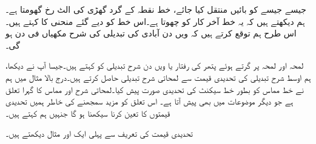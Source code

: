 جیسے جیسے  کو بائیں منتقل کیا جائے، خط  نقطہ  کے گرد گھڑی کی الٹ رخ گھومتا ہے۔ہم دیکھتے ہیں کہ یہ خط آخر کار  کو چھوتا ہے۔اس خط کو دیے گئے منحنی کا  کہتے ہیں۔اس طرح ہم توقع کرتے ہیں کہ  ویں دن آبادی کی تبدیلی کی شرح  مکھیاں فی دن ہو گی۔

لمحہ  اور لمحہ  پر گرتے ہوئے پتھر کی رفتار یا  ویں دن شرح تبدیلی کو  کہتے ہیں۔جیسا آپ نے دیکھا، ہم اوسط شرح تبدیلی کی تحدیدی قیمت سے لمحاتی شرح تبدیلی حاصل کرتے ہیں۔درج بالا مثال میں ہم نے خط مماس کو بطور خط سیکنٹ کی تحدیدی  صورت پیش کیا۔لمحاتی شرح اور مماس کا گہرا تعلق ہے جو دیگر موضوعات میں بھی پیش آتا ہے۔ اس تعلق کو مزید سمجھنے کی خاطر ہمیں  تحدیدی قیمتوں  کا تعین کرنا سیکھنا ہو گا جنہیں ہم  کہتے ہیں۔ 

تحدیدی قیمت کی تعریف سے پہلی ایک اور مثال دیکھتے ہیں۔

